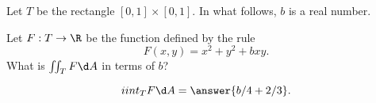 \documentclass{ximera}
\author{Jim Fowler}
\begin{document}
\begin{exercise}
  Let $T$ be the rectangle $[0,1] \times [0,1]$.  In what follows, $b$ is a real number.
  
  Let $F : T \to \R$ be the function defined by the rule
  \[
    F(x,y) = x^2 + y^2 + bxy.
  \]
  What is $\iint_T F \d A$ in terms of $b$?
  
  \begin{prompt}
    \[
      iint_T F \d A = \answer{b/4 + 2/3}.
    \]
  \end{prompt}

\end{exercise}
\end{document}
